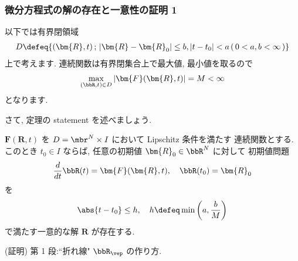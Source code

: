 \documentclass[openany, a4paper, oneside]{jsbook}
\begin{document}
\subsubsection{微分方程式の解の存在と一意性の証明 1}

以下では有界閉領域
\begin{gather}
 D \defeq \{ (\bm{R} , t ) \, ; \, | \bm{R} - \bm{R}_0 | \leq b , | t - t_0 | < a \, ( \, 0< a ,b < \infty \,) \}
\end{gather}
上で考えます.
連続関数は有界閉集合上で最大値, 最小値を取るので
\begin{gather}
 \max_{ ( \bbR , t ) \in D } | \bm{F} ( \bm{R} , t) | = M < \infty \label{eq:4-3}
\end{gather}
となります.

さて, 定理の statement を述べましょう.
\begin{thm}[微分方程式の解の存在と一意性 1]\label{th:微分方程式の解の一意性存在定理 1}
 $\bm{F} ( \bm{R} , t )$ を $D = \mbr^{N} \times I$ において Lipschitz 条件を満たす        連続関数とする.
 このとき $t_0 \in I$ ならば, 任意の初期値 $\bm{R}_0 \in \bbR^{N}$ に対して
 初期値問題
\begin{gather}
 \frac{d} {dt} \bbR (t)
 =
 \bm{F} ( \bm{R} , t ), \quad
 \bbR ( t_0 )
 =
 \bm{R}_0
\end{gather}
を
\begin{gather}
 \abs{t - t_0}
 \leq
 h, \quad
 h
 \defeq
 \min \left ( a, \frac{b} {M} \right) \label{eq:4-4}
\end{gather}
 で満たす一意的な解 $\bm{R}$ が存在する.
\end{thm}
(証明)
第 1 段:``折れ線" $\bbR_{\vep}$ の作り方.
\end{document}
